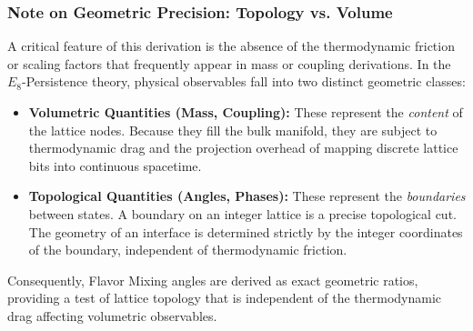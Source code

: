 \subsubsection{Note on Geometric Precision: Topology vs. Volume}
A critical feature of this derivation is the absence of the thermodynamic friction or scaling factors that frequently appear in mass or coupling derivations. In the $E_8$-Persistence theory, physical observables fall into two distinct geometric classes:
\begin{itemize}
    \item \textbf{Volumetric Quantities (Mass, Coupling):} These represent the \textit{content} of the lattice nodes. Because they fill the bulk manifold, they are subject to thermodynamic drag and the projection overhead of mapping discrete lattice bits into continuous spacetime.
    \item \textbf{Topological Quantities (Angles, Phases):} These represent the \textit{boundaries} between states. A boundary on an integer lattice is a precise topological cut. The geometry of an interface is determined strictly by the integer coordinates of the boundary, independent of thermodynamic friction.
\end{itemize}
Consequently, Flavor Mixing angles are derived as exact geometric ratios, providing a test of lattice topology that is independent of the thermodynamic drag affecting volumetric observables.




